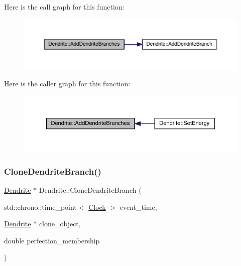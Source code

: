Here is the call graph for this function\+:\nopagebreak
\begin{figure}[H]
\begin{center}
\leavevmode
\includegraphics[width=350pt]{class_dendrite_a3e6a80da180b60290545cfc92f221a05_cgraph}
\end{center}
\end{figure}
Here is the caller graph for this function\+:\nopagebreak
\begin{figure}[H]
\begin{center}
\leavevmode
\includegraphics[width=350pt]{class_dendrite_a3e6a80da180b60290545cfc92f221a05_icgraph}
\end{center}
\end{figure}
\mbox{\label{class_dendrite_ab682ffb9bfd1a1da1623e6b641471068}} 
\subsubsection{\texorpdfstring{Clone\+Dendrite\+Branch()}{CloneDendriteBranch()}}
{\footnotesize\ttfamily \hyperlink{class_dendrite}{Dendrite} $\ast$ Dendrite\+::\+Clone\+Dendrite\+Branch (\begin{DoxyParamCaption}\item[{std\+::chrono\+::time\+\_\+point$<$ \hyperlink{universe_8h_a0ef8d951d1ca5ab3cfaf7ab4c7a6fd80}{Clock} $>$}]{event\+\_\+time,  }\item[{\hyperlink{class_dendrite}{Dendrite} $\ast$}]{clone\+\_\+object,  }\item[{double}]{perfection\+\_\+membership }\end{DoxyParamCaption})}



